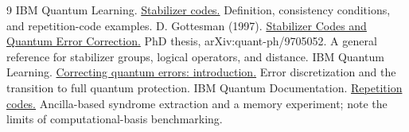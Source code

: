 \documentclass[11pt,a4paper]{article}
\begin{document}
\begin{thebibliography}{9}\small
{} IBM Quantum Learning. \href{https://quantum.cloud.ibm.com/learning/en/courses/foundations-of-quantum-error-correction/stabilizer-formalism/stabilizer-codes}{Stabilizer codes.} Definition, consistency conditions, and repetition-code examples.
 D. Gottesman (1997). \href{https://arxiv.org/abs/quant-ph/9705052}{Stabilizer Codes and Quantum Error Correction.} PhD thesis, arXiv:quant-ph/9705052. A general reference for stabilizer groups, logical operators, and distance.
 IBM Quantum Learning. \href{https://quantum.cloud.ibm.com/learning/en/courses/foundations-of-quantum-error-correction/correcting-quantum-errors/introduction}{Correcting quantum errors: introduction.} Error discretization and the transition to full quantum protection.
 IBM Quantum Documentation. \href{https://quantum.cloud.ibm.com/docs/en/tutorials/repetition-codes}{Repetition codes.} Ancilla-based syndrome extraction and a memory experiment; note the limits of computational-basis benchmarking.
\end{thebibliography}
\end{document}
